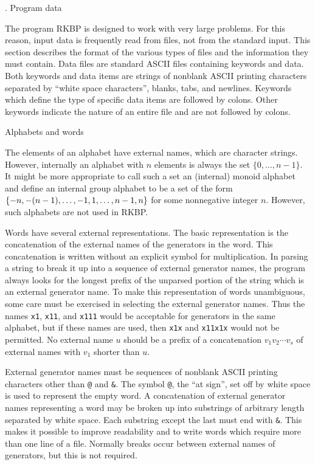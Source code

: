 \bigskip
{}. Program data

\nobreak

The program RKBP is designed to work with very large problems.  For
this reason, input data is frequently read from files, not from the
standard input. This section describes the format of the various types
of files and the information they must contain.  Data files are
standard ASCII files containing keywords and data. Both keywords and
data items are strings of nonblank ASCII printing characters separated
by ``white space characters'', blanks, tabs, and newlines.  Keywords
which define the type of specific data items are followed by colons.
Other keywords indicate the nature of an entire file and are not
followed by colons.

\bigskip
{} Alphabets and words

\nobreak

The elements of an alphabet have external names, which are character
strings. However, internally an alphabet with $n$ elements is always
the set $\{0,\dots,n-1\}$. It might be more appropriate to call such a
set an (internal) monoid alphabet and define an internal group
alphabet to be a set of the form $\{-n,-(n-\nobreak
1),\dots,-1,1,\dots,n-1,n\}$ for some nonnegative integer $n$.
However, such alphabets are not used in RKBP.

Words have several external representations. The basic representation
is the concatenation of the external names of the generators in the
word.  This concatenation is written without an explicit symbol for
multiplication. In parsing a string to break it up into a sequence of
external generator names, the program always looks for the longest
prefix of the unparsed portion of the string which is an external
generator name. To make this representation of words unambiguous, some
care must be exercised in selecting the external generator names. Thus
the names {\tt x1}, {\tt x11}, and {\tt x111} would be acceptable for
generators in the same alphabet, but if these names are used, then
{\tt x1x} and {\tt x11x1x} would not be permitted. No external name
$u$ should be a prefix of a concatenation $v_{1}v_{2}\cdots v_{s}$ of
external names with $v_1$ shorter than $u$.

External generator names must be sequences of nonblank ASCII printing
characters other than {\tt @} and {\tt \&}. The symbol {\tt @}, the
``at sign'', set off by white space is used to represent the empty
word. A concatenation of external generator names representing a word
may be broken up into substrings of arbitrary length separated by
white space. Each substring except the last must end with {\tt \&}.
This makes it possible to improve readability and to write words which
require more than one line of a file.  Normally breaks occur between
external names of generators, but this is not required.

